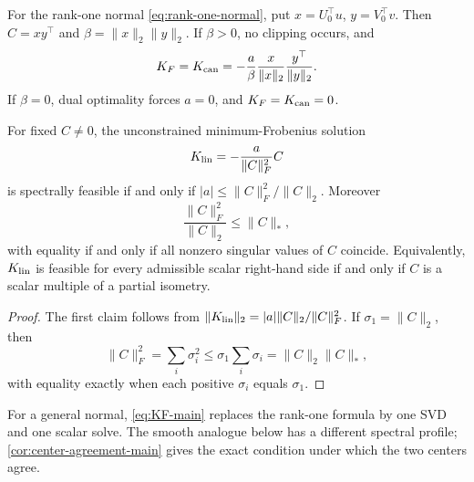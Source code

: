 For the rank-one normal \eqref{eq:rank-one-normal}, put
\(x=U_0^\top u\), \(y=V_0^\top v\).  Then
\(C=xy^\top\) and \(\beta=\|x\|_2\|y\|_2\).  If \(\beta>0\), no clipping
occurs, and
\begin{equation}
 K_F=K_{\rm can}
 =-\frac{a}{\beta}
 \frac{x}{\|x\|_2}\frac{y^\top}{\|y\|_2}.
 \label{eq:Kcan-main}
\end{equation}
If \(\beta=0\), dual optimality forces \(a=0\), and
\(K_F=K_{\rm can}=0\).

\begin{proposition}
\label{prop:partial-isometry}
For fixed \(C\ne0\), the unconstrained minimum-Frobenius solution
\[
 K_{\rm lin}=-\frac{a}{\|C\|_F^2}C
\]
is spectrally feasible if and only if
\(|a|\le\|C\|_F^2/\|C\|_2\).  Moreover
\begin{equation}
 \frac{\|C\|_F^2}{\|C\|_2}\le\|C\|_*,
 \label{eq:pi-inequality}
\end{equation}
with equality if and only if all nonzero singular values of \(C\) coincide.
Equivalently, \(K_{\rm lin}\) is feasible for every admissible scalar
right-hand side if and only if \(C\) is a scalar multiple of a partial
isometry.
\end{proposition}

\begin{proof}
The first claim follows from
\(\|K_{\rm lin}\|_2=|a|\|C\|_2/\|C\|_F^2\).  If \(\sigma_1=\|C\|_2\), then
\[
 \|C\|_F^2=\sum_i\sigma_i^2
 \le\sigma_1\sum_i\sigma_i=\|C\|_2\|C\|_*,
\]
with equality exactly when each positive \(\sigma_i\) equals \(\sigma_1\).
\end{proof}

For a general normal, \eqref{eq:KF-main} replaces the rank-one formula by one
SVD and one scalar solve.  The smooth analogue below has a different spectral
profile; \cref{cor:center-agreement-main} gives the exact condition under
which the two centers agree.
